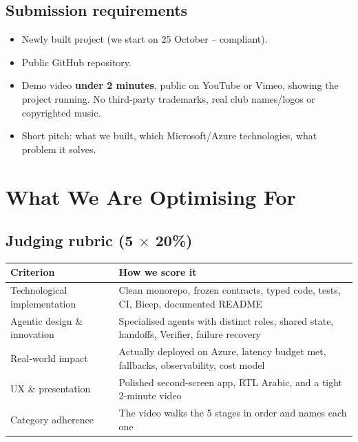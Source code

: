 \documentclass[11pt,a4paper]{article}
\begin{document}
\subsection{Submission requirements}
\begin{itemize}
  \item Newly built project (we start on 25 October -- compliant).
  \item Public GitHub repository.
  \item Demo video \textbf{under 2 minutes}, public on YouTube or Vimeo, showing the project running.
        No third-party trademarks, real club names/logos or copyrighted music.
  \item Short pitch: what we built, which Microsoft/Azure technologies, what problem it solves.
\end{itemize}

\section{What We Are Optimising For}

\subsection{\texorpdfstring{Judging rubric (5 $\times$ 20\%)}{Judging rubric (5 x 20\%)}}
\begin{tabularx}{\linewidth}{@{}l Y@{}}
\toprule
Criterion & How we score it \\
\midrule
Technological implementation & Clean monorepo, frozen contracts, typed code, tests, CI, Bicep, documented README \\
Agentic design \& innovation  & Specialised agents with distinct roles, shared state, handoffs, Verifier, failure recovery \\
Real-world impact            & Actually deployed on Azure, latency budget met, fallbacks, observability, cost model \\
UX \& presentation            & Polished second-screen app, RTL Arabic, and a tight 2-minute video \\
Category adherence           & The video walks the 5 stages in order and names each one \\
\bottomrule
\end{tabularx}
\end{document}

